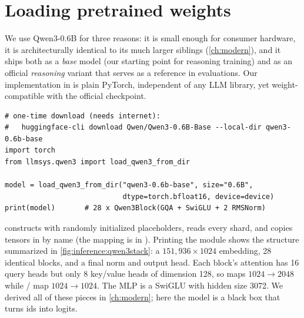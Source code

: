 \section{Loading pretrained weights}\label{sec:inference:loading}

We use Qwen3-0.6B for three reasons: it is small enough for consumer hardware, it is architecturally
identical to its much larger siblings (\cref{ch:modern}), and it ships both as a \emph{base}
model (our starting point for reasoning training) and as an official \emph{reasoning} variant
that serves as a reference in evaluations. Our implementation in  is plain
PyTorch, independent of any LLM library, yet weight-compatible with the official checkpoint.

\begin{lstlisting}[caption={Loading Qwen3-0.6B from a downloaded snapshot.},label={lst:inference:load}]
# one-time download (needs internet):
#   huggingface-cli download Qwen/Qwen3-0.6B-Base --local-dir qwen3-0.6b-base
import torch
from llmsys.qwen3 import load_qwen3_from_dir

model = load_qwen3_from_dir("qwen3-0.6b-base", size="0.6B",
                            dtype=torch.bfloat16, device=device)
print(model)       # 28 x Qwen3Block(GQA + SwiGLU + 2 RMSNorm)
\end{lstlisting}

 constructs  with randomly initialized placeholders,
reads every  shard, and copies tensors in by name (the mapping is in
). Printing the module shows the structure summarized in
\cref{fig:inference:qwen3stack}: a $151{,}936\times1024$ embedding, 28 identical blocks, and a final
norm and output head. Each block's attention has 16 query heads but only 8 key/value heads of
dimension 128, so  maps $1024\to2048$ while / map $1024\to1024$.
The MLP is a SwiGLU with hidden size 3072. We derived all of these pieces in \cref{ch:modern}; here
the model is a black box that turns ids into logits.

